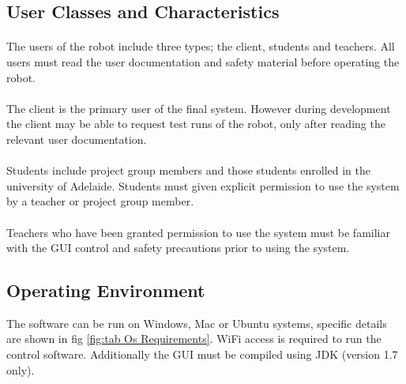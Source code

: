 \documentclass[10pt,a4paper,titlepage]{article}
\begin{document}
	\subsection{User Classes and Characteristics}
	\paragraph{}
	The users of the robot include three types; the client, students and teachers. All users must read the user documentation and safety material before operating the robot.
	\paragraph{}
	The client is the primary user of the final system. However during development the client may be able to request test runs of the robot, only after reading the relevant user documentation.
	\paragraph{} 
	Students include project group members and those students enrolled in the university of Adelaide. Students must given explicit permission to use the system by a teacher or project group member.
	\paragraph{}
	Teachers who have been granted permission to use the system must be familiar with the GUI control and safety precautions prior to using the system. 
	
	\subsection{Operating Environment}
	The software can be run on Windows, Mac or Ubuntu systems, specific details are shown in fig \ref{fig:tab Os Requirements}. WiFi access is required to run the control software. Additionally the GUI must be compiled using JDK (version 1.7 only).
	
\end{document}
